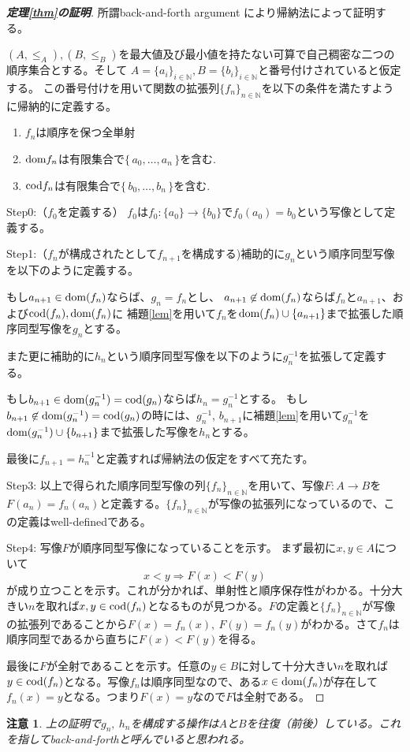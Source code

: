 \documentclass[leqno]{jsarticle}
\newtheorem*{cau}{注意}
\newcommand{\To}{\Longrightarrow}
\newcommand{\nn}{\mathbb{N}}
\newcommand{\dom}{\text{{\rm dom}}}
\newcommand{\cod}{\text{{\rm cod}}}
\begin{document}
\begin{proof}[\textbf{定理\ref{thm}の証明}]
所謂back-and-forth argument により帰納法によって証明する。\par
$(A,\le_A), (B,\le_B)$を最大値及び最小値を持たない可算で自己稠密な二つの順序集合とする。そして
$A=\{a_i\}_{i\in \nn}, B=\{b_i\}_{i\in \nn}$と番号付けされていると仮定する。
この番号付けを用いて関数の拡張列$\{f_n\}_{n\in \nn}$を以下の条件を満たすように帰納的に定義する。
\begin{enumerate}
\item $f_n$は順序を保つ全単射
\item $\dom f_n$は有限集合で$\{\,a_0,\dots, a_{n}\,\}$を含む.
\item $\cod f_n$は有限集合で$\{\,b_0,\dots,b_{n}\,\}$を含む.
\end{enumerate}\par
Step0:（$f_0$を定義する）
$f_0$は$f_0:\{a_0\}\to \{b_0\}$で$f_0(a_0)=b_0$という写像として定義する。\par
Step1:（$f_n$が構成されたとして$f_{n+1}$を構成する)補助的に$g_n$という順序同型写像を以下のように定義する。\par
もし$a_{n+1}\in \dom(f_n)$ならば、$g_n=f_n$とし、
$a_{n+1}\not\in \dom(f_n)$ならば$f_n$と$a_{n+1}$、および$\cod(f_n), \dom(f_n)$に
補題\ref{lem}を用いて$f_n$を$\dom(f_n)\cup \{a_{n+1}\}$まで拡張した順序同型写像を$g_n$とする。\par
また更に補助的に$h_n$という順序同型写像を以下のように$g_n^{-1}$を拡張して定義する。\par
もし$b_{n+1}\in \dom(g_n^{-1})=\cod(g_n)$ならば$h_n=g_n^{-1}$とする。
もし$b_{n+1}\not\in \dom(g_n^{-1})=\cod(g_n)$の時には、$g_n^{-1}$, $b_{n+1}$に補題\ref{lem}を用いて$g_n^{-1}$を$\dom(g_n^{-1})\cup\{b_{n+1}\}$まで拡張した写像を$h_n$とする。\par
最後に$f_{n+1}=h_n^{-1}$と定義すれば帰納法の仮定をすべて充たす。\par
Step3: 以上で得られた順序同型写像の列$\{f_n\}_{n\in \nn}$を用いて、写像$F:A\to B$を$F(a_n)=f_n(a_n)$と定義する。$\{f_n\}_{n\in \nn}$が写像の拡張列になっているので、この定義はwell-definedである。\par
Step4: 写像$F$が順序同型写像になっていることを示す。
まず最初に$x,y\in A$について
\[
x<y\To F(x)<F(y)
\]
が成り立つことを示す。これが分かれば、単射性と順序保存性がわかる。十分大きい$n$を取れば$x,y\in \cod(f_n)$となるものが見つかる。$F$の定義と$\{f_n\}_{n\in \nn}$が写像の拡張列であることから$F(x)=f_n(x),\ F(y)=f_n(y)$がわかる。さて$f_n$は順序同型であるから直ちに$F(x)<F(y)$を得る。\par
最後に$F$が全射であることを示す。任意の$y\in B$に対して十分大きい$n$を取れば$y\in \cod(f_n)$となる。写像$f_n$は順序同型なので、ある$x\in \dom(f_n)$が存在して$f_n(x)=y$となる。つまり$F(x)=y$なので$F$は全射である。
\end{proof}
\begin{cau}
上の証明で$g_n,\ h_n$を構成する操作は$A$と$B$を往復（前後）している。これを指してback-and-forthと呼んでいると思われる。
\end{cau}
\end{document}
